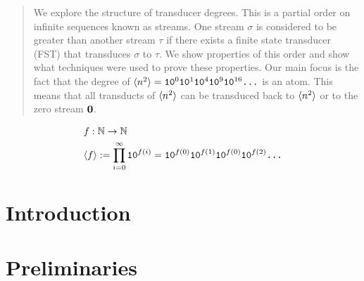 \documentclass{sthesis}
\begin{document}
	
	\begin{abstract}
		We explore the structure of transducer degrees. This is a partial order on infinite sequences known as streams. One stream $\sigma$ is considered to be greater than another stream $\tau$ if there exists a finite state transducer (FST) that transduces $\sigma$ to $\tau$. We show properties of this order and show what techniques were used to prove these properties. Our main focus is the fact that the degree of $\langle n^2 \rangle=\texttt{10}^0\texttt{10}^1\texttt{10}^4\texttt{10}^9\texttt{10}^{16}\texttt{...}$ is an atom. This means that all transducts of $\langle n^2 \rangle$ can be transduced back to $\langle n^2 \rangle$ or to the zero stream $\mathbf{0}$.
	\end{abstract}
		
	\tableofcontents

	\begin{align*}
		&f: \mathbb{N} \to \mathbb{N}\\
		&\langle f \rangle := \prod_{i=0}^{\infty}\texttt{10}^{f(i)} = \texttt{10}^{f(0)}\texttt{10}^{f(1)}\texttt{10}^{f(0)}\texttt{10}^{f(2)}\texttt{...}
	\end{align*}


	\chapter{Introduction}
		

	\chapter{Preliminaries}
		

	\newcommand{\sectionbreak}{\clearpage}

\end{document}
